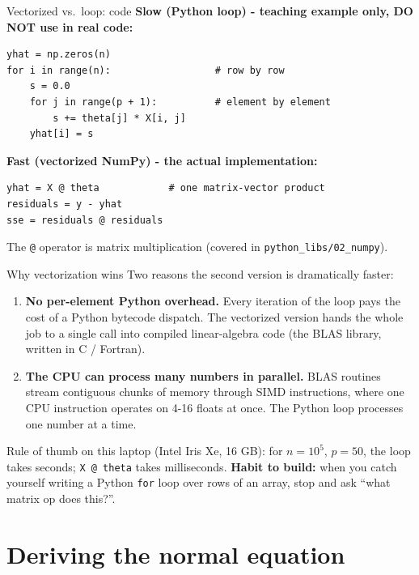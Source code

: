 \documentclass[aspectratio=169]{beamer}
\begin{document}
\begin{frame}[fragile]{Vectorized vs.\ loop: code}
  \textbf{Slow (Python loop) - teaching example only, DO NOT use in real code:}
\begin{lstlisting}
yhat = np.zeros(n)
for i in range(n):                  # row by row
    s = 0.0
    for j in range(p + 1):          # element by element
        s += theta[j] * X[i, j]
    yhat[i] = s
\end{lstlisting}
  \vfill
  \textbf{Fast (vectorized NumPy) - the actual implementation:}
\begin{lstlisting}
yhat = X @ theta            # one matrix-vector product
residuals = y - yhat
sse = residuals @ residuals
\end{lstlisting}
  \vfill
  The \texttt{@} operator is matrix multiplication (covered in \texttt{python\_libs/02\_numpy}).
\end{frame}

\begin{frame}{Why vectorization wins}
  Two reasons the second version is dramatically faster:
  \begin{enumerate}
    \item \textbf{No per-element Python overhead.} Every iteration of the loop pays the cost of a Python bytecode dispatch. The vectorized version hands the whole job to a single call into compiled linear-algebra code (the BLAS library, written in C / Fortran).
    \item \textbf{The CPU can process many numbers in parallel.} BLAS routines stream contiguous chunks of memory through SIMD instructions, where one CPU instruction operates on 4-16 floats at once. The Python loop processes one number at a time.
  \end{enumerate}
  \vfill
  Rule of thumb on this laptop (Intel Iris Xe, 16 GB): for $n = 10^5$, $p = 50$, the loop takes seconds; \texttt{X @ theta} takes milliseconds.
  \vfill
  \textbf{Habit to build:} when you catch yourself writing a Python \texttt{for} loop over rows of an array, stop and ask ``what matrix op does this?''.
\end{frame}

\section{Deriving the normal equation}
\end{document}
